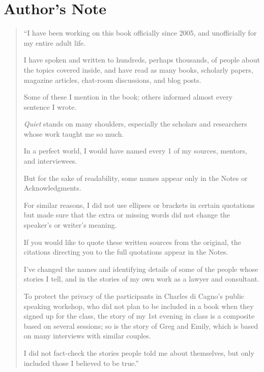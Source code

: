 \documentclass[oneside]{article}
\numberwithin{equation}{section}
\begin{document}
\section*{Author's Note}
\begin{quotation}
    ``I have been working on this book officially since 2005, and unofficially for my entire adult life.
    
    I have spoken and written to hundreds, perhaps thousands, of people about the topics covered inside, and have read as many books, scholarly papers, magazine articles, chat-room discussions, and blog posts.
    
    Some of these I mention in the book; others informed almost every sentence I wrote.
    
    \textit{Quiet} stands on many shoulders, especially the scholars and researchers whose work taught me so much.
    
    In a perfect world, I would have named every 1 of my sources, mentors, and interviewees.
    
    But for the sake of readability, some names appear
    only in the Notes or Acknowledgments.
    
    For similar reasons, I did not use ellipses or brackets in certain quotations but made sure that the extra or missing words did not change the speaker's or writer's meaning.
    
    If you would like to quote these written sources from the original, the citations directing you to the full quotations appear in the Notes.
    
    I've changed the names and identifying details of some of the people whose stories I tell, and in the stories of my own work as a lawyer and consultant.
    
    To protect the privacy of the participants in Charles di Cagno's public speaking workshop, who did not plan to be included in a book when they signed up for the class, the story of my 1st evening in class is a composite based on several sessions; so is the story of Greg and Emily, which is based on many interviews with similar couples.
    
    
    I did not fact-check the stories people told me about themselves, but only included those I believed to be true.''
\end{quotation}
\end{document}
